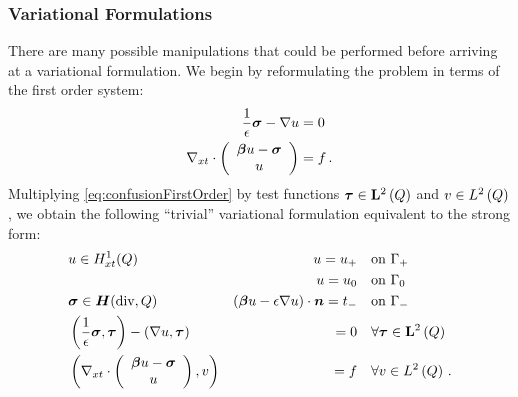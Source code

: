 \documentclass{article}
\theoremstyle{definition}
\theoremstyle{remark}
\begin{document}
\subsubsection{Variational Formulations}
There are many possible manipulations that could be performed before arriving at a variational formulation. 
We begin by reformulating the problem in terms of the first order system:
\begin{equation}
\label{eq:confusionFirstOrder}
\begin{aligned}
\frac{1}{\epsilon}\boldsymbol\sigma-\nabla u&=0\\
\nabla_{xt}\cdot\left( \begin{array}{c} \boldsymbol\beta u-\boldsymbol\sigma\\ u\\ \end{array} \right)&=f\,.
\end{aligned}
\end{equation}
Multiplying \eqref{eq:confusionFirstOrder} by test functions $\boldsymbol\tau\in\mathbf{L}^2\left( Q \right)$ and $v\in L^2\left( Q \right)$, we obtain the following 
``trivial'' variational formulation equivalent to the strong form:
\begin{equation}
\label{eq:confusionStrongBF}
	\begin{aligned}
		&u\in H^1_{xt}(Q) &u=u_+\quad &\text{on }\Gamma_+\\
		& &u=u_0\quad &\text{on }\Gamma_0\\
		&\boldsymbol\sigma\in \mbox{\boldmath $H$}(\text{div},Q)&(\boldsymbol\beta u-\epsilon\nabla u)\cdot\boldsymbol n=t_-\quad &\text{on }\Gamma_-\\
		&\left( \frac{1}{\epsilon}\boldsymbol\sigma,\boldsymbol\tau \right)-\left( \nabla u,\boldsymbol\tau \right)&=0\quad&\forall\boldsymbol\tau\in\mathbf{L}^2\left( Q \right)\\
		&\left( \nabla_{xt}\cdot\left( \begin{array}{c} \boldsymbol\beta u-\boldsymbol\sigma\\ u\\ \end{array} \right),v \right)&=f\quad&\forall v\in L^2\left( Q \right)\,.
	\end{aligned}
\end{equation}
\end{document}
